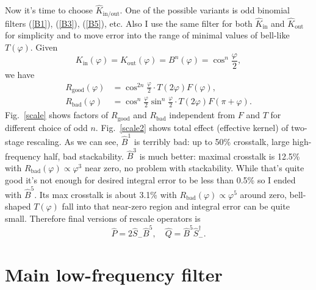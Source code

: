 \documentclass[10pt]{article}
\begin{document}
Now it's time to choose $\hat K_{\text{in/out}}$. One of the possible variants is odd binomial
filters (\ref{B1}), (\ref{B3}), (\ref{B5}), etc. Also I use the same filter for both $\hat
K_{\text{in}}$ and $\hat K_{\text{out}}$ for simplicity and to move error into the range of minimal
values of bell-like $T(\varphi)$. Given
\begin{equation}
    K_{\text{in}}(\varphi) = K_{\text{out}}(\varphi) = B^n(\varphi) = \cos^n\frac\varphi2,
\end{equation}
we have
\begin{align}
    R_{\text{good}}(\varphi) &= \cos^{2n}\frac\varphi2 \cdot T(2\varphi)F(\varphi),\\
    R_{\text{bad}}(\varphi) &= \cos^n\frac\varphi2\sin^n\frac\varphi2 \cdot T(2\varphi)F(\pi+\varphi).
\end{align}
Fig.~\ref{scale} shows factors of $R_{\text{good}}$ and $R_{\text{bad}}$ independent from $F$ and
$T$ for different choice of odd $n$. Fig.~\ref{scale2} shows total effect (effective kernel) of
two-stage rescaling. As we can see, $\hat B^1$ is terribly bad: up to 50\% crosstalk, large
high-frequency half, bad stackability. $\hat B^3$ is much better: maximal crosstalk is 12.5\% with
$R_{\text{bad}}(\varphi) \propto \varphi^3$ near zero, no problem with stackability. While that's
quite good it's not enough for desired integral error to be less than 0.5\% so I ended with
$\hat B^5$. Its max crosstalk is about 3.1\% with $R_{\text{bad}}(\varphi) \propto \varphi^5$ around
zero, bell-shaped $T(\varphi)$ fall into that near-zero region and integral error can be quite
small. Therefore final versions of rescale operators is
\begin{equation}
    \hat P = 2\hat S_-\hat B^5,\quad
    \hat Q = \hat B^5\hat S^\dagger_-.
\end{equation}


\section{Main low-frequency filter}
\end{document}
